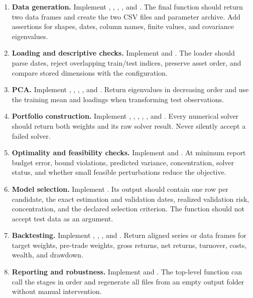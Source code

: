 \documentclass[10pt]{article}
\begin{document}
\begingroup
\raggedright
\begin{enumerate}[label=\textbf{A.\arabic*.}]
\item \textbf{Data generation.} Implement
,
,
,
, and
.
The final function should return two data frames and create the two CSV files and
parameter archive. Add assertions for shapes, dates, column names, finite
values, and covariance eigenvalues.

\item \textbf{Loading and descriptive checks.} Implement
 and
.
The loader should parse dates, reject overlapping train/test indices, preserve
asset order, and compare stored dimensions with the configuration.

\item \textbf{PCA.} Implement
,
, ,
, and
.
Return eigenvalues in decreasing order and use the training mean and loadings
when transforming test observations.

\item \textbf{Portfolio construction.} Implement
, ,
,
,
, and
.
Every numerical solver should return both weights and its raw solver result.
Never silently accept a failed solver.

\item \textbf{Optimality and feasibility checks.} Implement
 and
.
At minimum report budget error, bound violations, predicted variance,
concentration, solver status, and whether small feasible perturbations reduce
the objective.

\item \textbf{Model selection.} Implement
.
Its output should contain one row per candidate, the exact estimation and
validation dates, realized validation risk, concentration, and the declared
selection criterion. The function should not accept test data as an argument.

\item \textbf{Backtesting.} Implement
, ,
, and
.
Return aligned series or data frames for target weights, pre-trade weights,
gross returns, net returns, turnover, costs, wealth, and drawdown.

\item \textbf{Reporting and robustness.} Implement
 and .
The top-level  function can call the stages in order and
regenerate all files from an empty output folder without manual intervention.
\end{enumerate}
\endgroup
\end{document}
